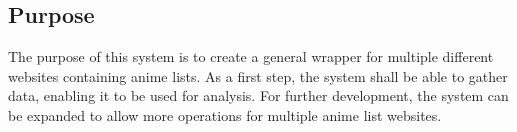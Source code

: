 \subsection{Purpose}
The purpose of this system is to create a general wrapper for multiple different websites containing anime lists.
As a first step, the system shall be able to gather data, enabling it to be used for analysis.
For further development, the system can be expanded to allow more operations for multiple anime list websites.

